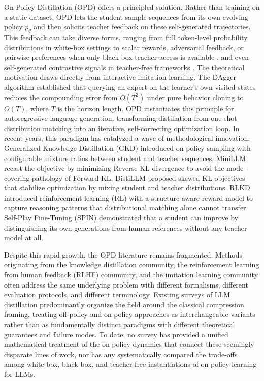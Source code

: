 \documentclass{article} %
\newcommand{\ptheta}{p_\theta}
\begin{document}
On-Policy Distillation (OPD) offers a principled solution. Rather than training on a static dataset, OPD lets the student sample sequences from its own evolving policy $\ptheta$ and then solicits teacher feedback on these self-generated trajectories. This feedback can take diverse forms, ranging from full token-level probability distributions in white-box settings \citep{2306.13649,2306.08543} to scalar rewards, adversarial feedback, or pairwise preferences when only black-box teacher access is available \citep{2511.10643,2305.12870}, and even self-generated contrastive signals in teacher-free frameworks \citep{2401.01335}. The theoretical motivation draws directly from interactive imitation learning. The DAgger algorithm \citep{ross2011reduction} established that querying an expert on the learner's own visited states reduces the compounding error from $O(T^2)$ under pure behavior cloning to $O(T)$, where $T$ is the horizon length. OPD instantiates this principle for autoregressive language generation, transforming distillation from one-shot distribution matching into an iterative, self-correcting optimization loop. In recent years, this paradigm has catalyzed a wave of methodological innovation. Generalized Knowledge Distillation (GKD) \citep{2306.13649} introduced on-policy sampling with configurable mixture ratios between student and teacher sequences. MiniLLM \citep{2306.08543} recast the objective by minimizing Reverse KL divergence to avoid the mode-covering pathology of Forward KL. DistiLLM \citep{2402.03898} proposed skewed KL objectives that stabilize optimization by mixing student and teacher distributions. RLKD \citep{2505.16142} introduced reinforcement learning (RL) with a structure-aware reward model to capture reasoning patterns that distributional matching alone cannot transfer. Self-Play Fine-Tuning (SPIN) \citep{2401.01335} demonstrated that a student can improve by distinguishing its own generations from human references without any teacher model at all.

Despite this rapid growth, the OPD literature remains fragmented. Methods originating from the knowledge distillation community, the reinforcement learning from human feedback (RLHF) community, and the imitation learning community often address the same underlying problem with different formalisms, different evaluation protocols, and different terminology. Existing surveys of LLM distillation \citep{2402.13116} predominantly organize the field around the classical compression framing, treating off-policy and on-policy approaches as interchangeable variants rather than as fundamentally distinct paradigms with different theoretical guarantees and failure modes. To date, no survey has provided a unified mathematical treatment of the on-policy dynamics that connect these seemingly disparate lines of work, nor has any systematically compared the trade-offs among white-box, black-box, and teacher-free instantiations of on-policy learning for LLMs.
\end{document}
